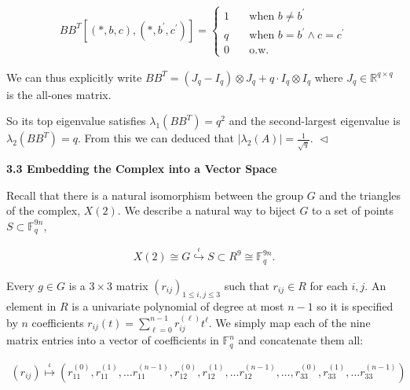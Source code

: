 \documentclass[10pt,a4paper]{article}
\begin{document}
\[\begin{gathered}
BB^{T}[(*,b,c),(*,b^{\prime},c^{\prime})]=\begin{cases}1\quad&\text{when }b\neq b^{\prime}\\
q&\text{when }b=b^{\prime}\land c=c^{\prime}\\
0&\text{o.w.}\end{cases}
\end{gathered}\]




We can thus explicitly write $BB^{T}=(J_{q}-I_{q})\otimes J_{q}+q\cdot I_{q}\otimes I_{q}$ where $J_{q}\in\mathbb{R}^{q\times q}$ is the all-ones matrix.\par




So its top eigenvalue satisfies $\lambda_{1}(BB^{T})=q^{2}$ and the second-largest eigenvalue is $\lambda_{2}(BB^{T})=q$. From this we can deduced that $|\lambda_{2}(A)|=\frac{1}{\sqrt{q}}$.
$\vartriangleleft$\par






\par\medskip\noindent\textbf{
3.3 Embedding the Complex into a Vector Space}\par




Recall that there is a natural isomorphism between the group $G$ and the triangles of the complex, $X(2)$. We describe a natural way to biject $G$ to a set of points $S\subset\mathbb{F}_{q}^{9n}$,\par


\[\begin{gathered}
X(2)\cong G\stackrel{{\scriptstyle\iota}}{{\hookrightarrow}}S\subset R^{9}\cong\mathbb{F}_{q}^{9n}.
\end{gathered}\]


Every $g\in G$ is a $3\times 3$ matrix $(r_{ij})_{1\leq i,j\leq 3}$ such that $r_{ij}\in R$ for each $i,j$. An element in $R$ is a univariate polynomial of degree at most $n-1$ so it is specified by $n$ coefficients $r_{ij}(t)=\sum_{\ell=0}^{n-1}r_{ij}^{(\ell)}t^{\ell}$. We simply map each of the nine matrix entries into a vector of coefficients in $\mathbb{F}_{q}^{n}$ and concatenate them all:\par


\[\begin{gathered}
(r_{ij})\stackrel{{\scriptstyle\iota}}{{\longmapsto}}\left(r^{(0)}_{11},r^{(1)}_{11},\ldots r^{(n-1)}_{11},r^{(0)}_{12},r^{(1)}_{12},\ldots r^{(n-1)}_{12},\ldots,r^{(0)}_{33},r^{(1)}_{33},\ldots r^{(n-1)}_{33}\right)
\end{gathered}\]
\end{document}
